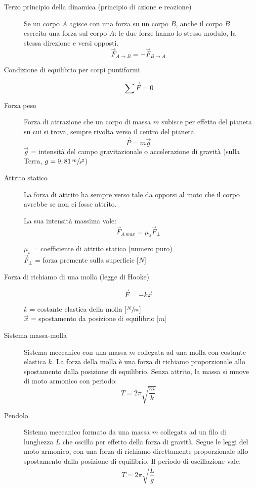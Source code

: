 \documentclass[a4paper,11pt,italian]{article}
\begin{document}
\begin{description}
  \item[Terzo principio della dinamica (principio di azione e reazione)] 
  Se un corpo $ A $ agisce con una forza su un corpo $ B $, anche il corpo $ B $ esercita una forza sul corpo $ A $: le due forze hanno lo stesso modulo, la stessa direzione e versi opposti.
  \[ \vec{F}_{A \rightarrow B} = - \vec{F}_{B \rightarrow A}\]
  
  \item[Condizione di equilibrio per corpi puntiformi]
  \[ \sum\vec{F} = 0 \]
  
  \item[Forza peso] 
  Forza di attrazione che un corpo di massa $ m $ subisce per effetto del pianeta su cui si trova, sempre rivolta verso il centro del pianeta.
  \[ \vec{P} = m \vec{g} \]
  $ \vec{g} $ = intensità del campo gravitazionale o accelerazione di gravità (sulla Terra, $ g=9,81 \, \sfrac{m}{s^2} $)
  
  \item[Attrito statico] 
  La forza di attrito ha sempre verso tale da opporsi al moto che il corpo avrebbe se non ci fosse attrito.
  
  La sua intensità massima vale:
  \[ \vec{F}_{A \, max} = \mu_s \vec{F}_\perp  \]
  \begin{multicols}{2}
  $ \mu_s $ = coefficiente di attrito statico (numero puro)\\
  $ \vec{F}_\perp $ = forza premente sulla superficie [$ N $]
  \end{multicols}
  
  \item[Forza di richiamo di una molla (legge di Hooke)]
  \[ \vec{F} = - k \vec{x} \]
  \begin{multicols}{2}
  $ k $ = costante elastica della molla [$ \sfrac{N}{m} $]\\
  $ \vec{x} $ = spostamento da posizione di equilibrio [$ m $]
  \end{multicols}
  
  \item[Sistema massa-molla] 
  Sistema meccanico con una massa $ m $ collegata ad una molla con costante elastica $ k $. La forza della molla è una forza di richiamo proporzionale allo spostamento dalla posizione di equilibrio. Senza attrito, la massa si muove di moto armonico con periodo:
  \[ T = 2\pi\sqrt{\frac{m}{k}} \]
  
  \item[Pendolo] 
  Sistema meccanico formato da una massa $ m $ collegata ad un filo di lunghezza $ L $ che oscilla per effetto della forza di gravità. Segue le leggi del moto armonico, con una forza di richiamo direttamente proporzionale allo spostamento dalla posizione di equilibrio. Il periodo di oscillazione vale:
  \[ T = 2\pi\sqrt{\frac{L}{g}} \]
\end{description}
\end{document}
